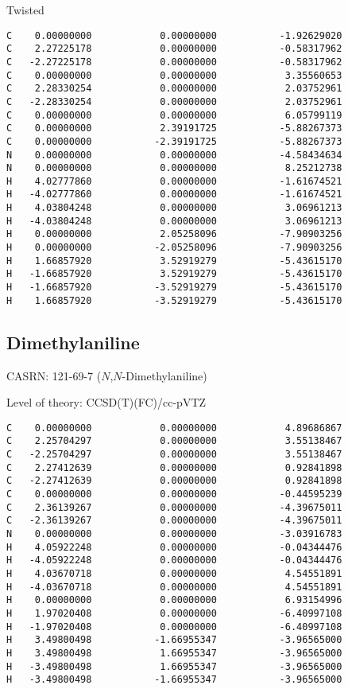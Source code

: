 \documentclass[journal=jctcce,manuscript=article,layout=traditional]{achemso}
\newcommand{\TZ}{cc-pVTZ}
\begin{document}
\begin{singlespace}
\noindent Twisted
\begin{verbatim}
C    0.00000000            0.00000000           -1.92629020
C    2.27225178            0.00000000           -0.58317962
C   -2.27225178            0.00000000           -0.58317962
C    0.00000000            0.00000000            3.35560653
C    2.28330254            0.00000000            2.03752961
C   -2.28330254            0.00000000            2.03752961
C    0.00000000            0.00000000            6.05799119
C    0.00000000            2.39191725           -5.88267373
C    0.00000000           -2.39191725           -5.88267373
N    0.00000000            0.00000000           -4.58434634
N    0.00000000            0.00000000            8.25212738
H    4.02777860            0.00000000           -1.61674521
H   -4.02777860            0.00000000           -1.61674521
H    4.03804248            0.00000000            3.06961213
H   -4.03804248            0.00000000            3.06961213
H    0.00000000            2.05258096           -7.90903256
H    0.00000000           -2.05258096           -7.90903256
H    1.66857920            3.52919279           -5.43615170
H   -1.66857920            3.52919279           -5.43615170
H   -1.66857920           -3.52919279           -5.43615170
H    1.66857920           -3.52919279           -5.43615170
\end{verbatim}
\end{singlespace}

\subsection{Dimethylaniline}

CASRN: 121-69-7 ($N$,$N$-Dimethylaniline)

\begin{singlespace}
\noindent Level of theory: CCSD(T)(FC)/{\TZ}
\begin{verbatim}
C    0.00000000            0.00000000            4.89686867
C    2.25704297            0.00000000            3.55138467
C   -2.25704297            0.00000000            3.55138467
C    2.27412639            0.00000000            0.92841898
C   -2.27412639            0.00000000            0.92841898
C    0.00000000            0.00000000           -0.44595239
C    2.36139267            0.00000000           -4.39675011
C   -2.36139267            0.00000000           -4.39675011
N    0.00000000            0.00000000           -3.03916783
H    4.05922248            0.00000000           -0.04344476
H   -4.05922248            0.00000000           -0.04344476
H    4.03670718            0.00000000            4.54551891
H   -4.03670718            0.00000000            4.54551891
H    0.00000000            0.00000000            6.93154996
H    1.97020408            0.00000000           -6.40997108
H   -1.97020408            0.00000000           -6.40997108
H    3.49800498           -1.66955347           -3.96565000
H    3.49800498            1.66955347           -3.96565000
H   -3.49800498            1.66955347           -3.96565000
H   -3.49800498           -1.66955347           -3.96565000
\end{verbatim}
\end{singlespace}
\end{document}
